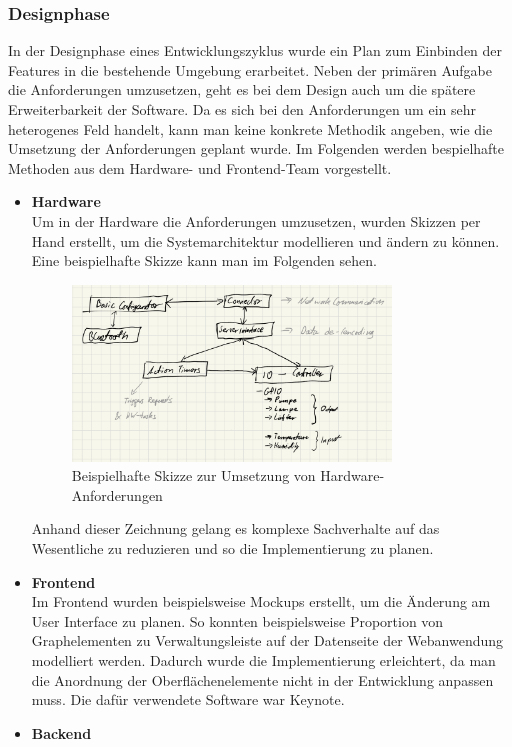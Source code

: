         \subsubsection*{Designphase}
        In der Designphase eines Entwicklungszyklus wurde ein Plan zum Einbinden der Features in die bestehende 
        Umgebung erarbeitet. Neben der primären Aufgabe die Anforderungen umzusetzen, geht es bei dem Design auch 
        um die spätere Erweiterbarkeit der Software. Da es sich bei den Anforderungen um ein sehr heterogenes 
        Feld handelt, kann man keine konkrete Methodik angeben, wie die Umsetzung der Anforderungen geplant
        wurde. Im Folgenden werden bespielhafte Methoden aus dem Hardware- und Frontend-Team vorgestellt. 
        \begin{itemize}
            \item \textbf{Hardware}\\
            Um in der Hardware die Anforderungen umzusetzen, wurden Skizzen per Hand erstellt, um die Systemarchitektur 
            modellieren und ändern zu können. Eine beispielhafte Skizze kann man im Folgenden sehen. 
            
            \begin{figure}[h]
                \centering
                \includegraphics[width=0.8\textwidth]{images/sketch_hardware}
                \caption{Beispielhafte Skizze zur Umsetzung von Hardware-Anforderungen}
                \label{fig:example}
            \end{figure}

            Anhand dieser Zeichnung gelang es komplexe Sachverhalte auf das Wesentliche zu reduzieren und so 
            die Implementierung zu planen. 
            
            
            \item \textbf{Frontend}\\
            Im Frontend wurden beispielsweise Mockups erstellt, um die Änderung am User Interface zu planen. 
            So konnten beispielsweise Proportion von Graphelementen zu Verwaltungsleiste auf der Datenseite der
            Webanwendung modelliert werden. Dadurch wurde die Implementierung erleichtert, da man die Anordnung 
            der Oberflächenelemente nicht in der Entwicklung anpassen muss. Die dafür verwendete Software war 
            Keynote. 

            \item \textbf{Backend}
        \end{itemize}

